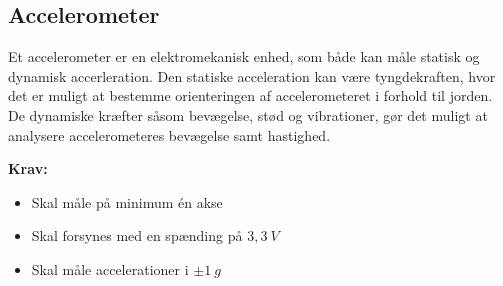 \subsection{Accelerometer}
Et accelerometer er en elektromekanisk enhed, som både kan måle statisk og dynamisk accerleration. Den statiske acceleration kan være tyngdekraften, hvor det er muligt at bestemme orienteringen af accelerometeret i forhold til jorden. De dynamiske kræfter såsom bevægelse, stød og vibrationer, gør det muligt at analysere accelerometeres bevægelse samt hastighed. 

\textbf{Krav:}
\begin{itemize}
\item Skal måle på minimum én akse
\item Skal forsynes med en spænding på $3,3~V$
\item Skal måle accelerationer i $\pm1~g$
\end{itemize}
